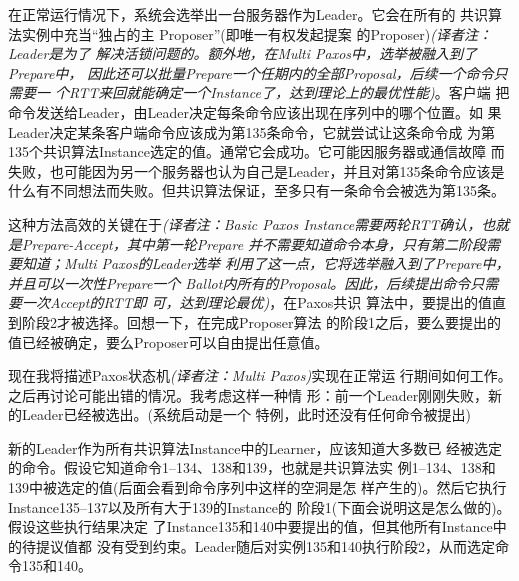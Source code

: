 在正常运行情况下，系统会选举出一台服务器作为Leader。它会在所有的
共识算法实例中充当“独占的主 Proposer”(即唯一有权发起提案
的Proposer)\emph{(译者注：Leader是为了
解决活锁问题的。额外地，在Multi Paxos中，选举被融入到了Prepare中，
因此还可以批量Prepare一个任期内的全部Proposal，后续一个命令只需要一
个RTT来回就能确定一个Instance了，达到理论上的最优性能)}。客户端
把命令发送给Leader，由Leader决定每条命令应该出现在序列中的哪个位置。如
果Leader决定某条客户端命令应该成为第135条命令，它就尝试让这条命令成
为第135个共识算法Instance选定的值。通常它会成功。它可能因服务器或通信故障
而失败，也可能因为另一个服务器也认为自己是Leader，并且对第135条命令应该是
什么有不同想法而失败。但共识算法保证，至多只有一条命令会被选为第135条。

这种方法高效的关键在于\emph{(译者注：Basic Paxos
Instance需要两轮RTT确认，也就是Prepare-Accept，其中第一轮Prepare
并不需要知道命令本身，只有第二阶段需要知道；Multi Paxos的Leader选举
利用了这一点，它将选举融入到了Prepare中，并且可以一次性Prepare一个
Ballot内所有的Proposal。因此，后续提出命令只需要一次Accept的RTT即
可，达到理论最优)}，在Paxos共识
算法中，要提出的值直到阶段2才被选择。回想一下，在完成Proposer算法
的阶段1之后，要么要提出的值已经被确定，要么Proposer可以自由提出任意值。

现在我将描述Paxos状态机\emph{(译者注：Multi Paxos)}实现在正常运
行期间如何工作。之后再讨论可能出错的情况。我考虑这样一种情
形：前一个Leader刚刚失败，新的Leader已经被选出。(系统启动是一个
特例，此时还没有任何命令被提出)

新的Leader作为所有共识算法Instance中的Learner，应该知道大多数已
经被选定的命令。假设它知道命令1--134、138和139，也就是共识算法实
例1--134、138和139中被选定的值(后面会看到命令序列中这样的空洞是怎
样产生的)。然后它执行Instance135--137以及所有大于139的Instance的
阶段1(下面会说明这是怎么做的)。假设这些执行结果决定
了Instance135和140中要提出的值，但其他所有Instance中的待提议值都
没有受到约束。Leader随后对实例135和140执行阶段2，从而选定命
令135和140。

